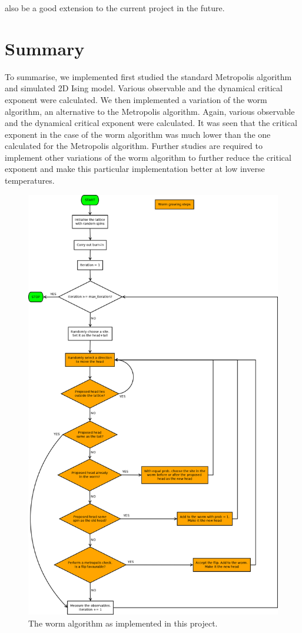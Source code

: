 \documentclass[%
reprint,
 amsmath,amssymb,
 aps,
]{revtex4-2}
\begin{document}
also be a good extension to the current project in the future.

\section{Summary}
To summarise, we implemented first studied the standard Metropolis algorithm and simulated 2D Ising model. Various observable and the dynamical critical exponent were calculated. We then implemented a variation of the worm algorithm, an alternative to the Metropolis algorithm. Again, various observable and the dynamical critical exponent were calculated. It was seen that the critical exponent in the case of the worm algorithm was much lower than the one calculated for the Metropolis algorithm. Further studies are required to implement other variations of the worm algorithm to further reduce the critical exponent and make this particular implementation better at low inverse temperatures.



\appendix
\begin{figure}
    \centering
    \includegraphics[scale=0.22]{worm_flowchart.png}
    \caption{The worm algorithm as implemented in this project.}
    \label{fig:flow}
\end{figure}
\end{document}
